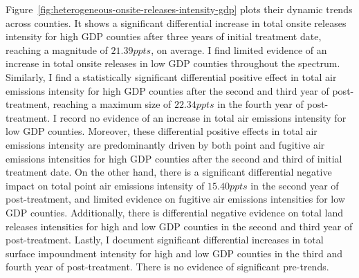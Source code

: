 \documentclass[12pt, english]{article}
\begin{document}
    Figure~\ref{fig:heterogeneous-onsite-releases-intensity-gdp} plots their dynamic trends across counties. It shows a significant differential increase in total onsite releases intensity for high GDP counties after three years of initial treatment date, reaching a magnitude of $21.39ppts$, on average. I find limited evidence of an increase in total onsite releases in low GDP counties throughout the spectrum. Similarly, I find a statistically significant differential positive effect in total air emissions intensity for high GDP counties after the second and third year of post-treatment, reaching a maximum size of $22.34ppts$ in the fourth year of post-treatment. I record no evidence of an increase in total air emissions intensity for low GDP counties. Moreover, these differential positive effects in total air emissions intensity are predominantly driven by both point and fugitive air emissions intensities for high GDP counties after the second and third of initial treatment date. On the other hand, there is a significant differential negative impact on total point air emissions intensity of $15.40ppts$ in the second year of post-treatment, and limited evidence on fugitive air emissions intensities for low GDP counties. Additionally, there is differential negative evidence on total land releases intensities for high and low GDP counties in the second and third year of post-treatment. Lastly, I document significant differential increases in total surface impoundment intensity for high and low GDP counties in the third and fourth year of post-treatment. There is no evidence of significant pre-trends.
\end{document}
